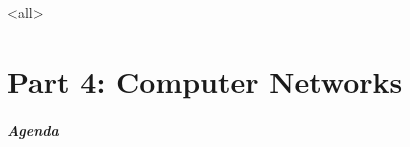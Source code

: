 














\mode
<all>


\part{Part 4: Computer Networks}


\begin{frame}[t]\frametitle{Agenda}
	\tableofcontents[subsubsectionstyle=hide]
\end{frame}











% 


\begin{frame}[t]\frametitle{}
    

\end{frame}

